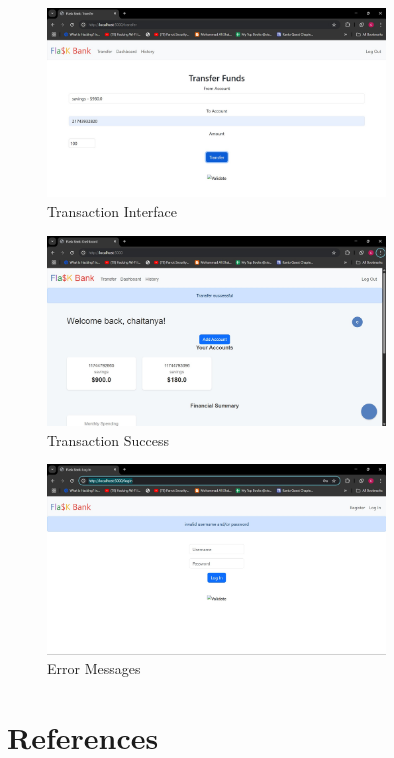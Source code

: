 \begin{figure}[h]
    \centering
    \includegraphics[width=0.8\textwidth]{flask_assets/transfers.jpg}
    \caption{Transaction Interface}
\end{figure}

\begin{figure}[h]
    \centering
    \includegraphics[width=0.8\textwidth]{flask_assets/transfer_success.jpg}
    \caption{Transaction Success}
\end{figure}

\begin{figure}[h]
    \centering
    \includegraphics[width=0.8\textwidth]{flask_assets/error.jpg}
    \caption{Error Messages}
\end{figure}

\chapter{References}

